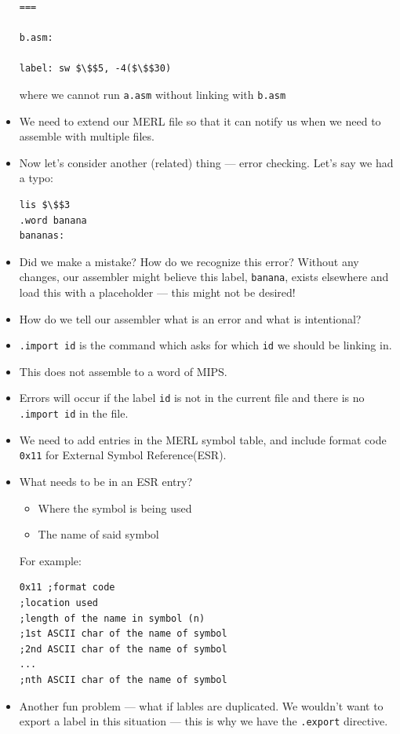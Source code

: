 \documentclass[12pt]{article}
\begin{document}
\begin{itemize}
\begin{lstlisting}[mathescape, numbers=none, breaklines=true]
===

b.asm:

label: sw $\$$5, -4($\$$30)
\end{lstlisting}
    where we cannot run \lstinline[mathescape]{a.asm} without linking with \lstinline[mathescape]{b.asm} 
    \item We need to extend our MERL file so that it can notify us when we need to assemble with multiple files.
    \item Now let's consider another (related) thing --- error checking.  Let's say we had a typo:
\begin{lstlisting}[mathescape, numbers=none, breaklines=true]
lis $\$$3
.word banana
bananas:
\end{lstlisting}
    \item Did we make a mistake?  How do we recognize this error?  Without any changes, our assembler might believe this label, \lstinline[mathescape]{banana}, exists elsewhere and load this with a placeholder --- this might not be desired!
    \item How do we tell our assembler what is an error and what is intentional?
    \item \lstinline[mathescape]{.import id} is the command which asks for which \lstinline[mathescape]{id} we should be linking in.
    \item This does not assemble to a word of MIPS.
    \item Errors will occur if the label \lstinline[mathescape]{id} is not in the current file and there is no \lstinline[mathescape]{.import id} in the file.
    \item We need to add entries in the MERL symbol table, and include format code \lstinline[mathescape]{0x11} for External Symbol Reference(ESR).
    \item What needs to be in an ESR entry?
        \begin{itemize}
            \item Where the symbol is being used
            \item The name of said symbol
        \end{itemize}
       For example:
\begin{lstlisting}[mathescape, numbers=none, breaklines=true]
0x11 ;format code
;location used
;length of the name in symbol (n)
;1st ASCII char of the name of symbol
;2nd ASCII char of the name of symbol
...
;nth ASCII char of the name of symbol
\end{lstlisting}
    \item Another fun problem --- what if lables are duplicated.  We wouldn't want to export a label in this situation --- this is why we have the \lstinline[mathescape]{.export} directive.

\end{itemize}
\end{document}
